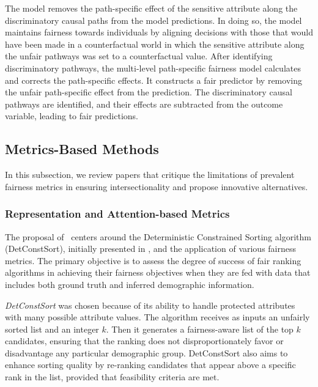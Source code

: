 The model removes the path-specific effect of the sensitive attribute along the discriminatory causal paths from the model predictions. In doing so, the model maintains fairness towards individuals by aligning decisions with those that would have been made in a counterfactual world in which the sensitive attribute along the unfair pathways was set to a counterfactual value.
After identifying discriminatory pathways, the multi-level path-specific fairness model calculates and corrects the path-specific effects. It constructs a fair predictor by removing the unfair path-specific effect from the prediction. The discriminatory causal pathways are identified, and their effects are subtracted from the outcome variable, leading to fair predictions.


\subsection{Metrics-Based Methods}
\label{subsec:intrank_meth_metr}

In this subsection, we review papers that critique the limitations of prevalent fairness metrics in ensuring intersectionality and propose innovative alternatives.


\subsubsection{Representation and Attention-based Metrics}
\label{subsec:intrank_meth_metr_17n}

The proposal of~\cite{ghosh2021fair} centers around the Deterministic Constrained Sorting algorithm (DetConstSort), initially presented in \cite{geyik2019fairness}, and the application of various fairness metrics. The primary objective is to assess the degree of success of fair ranking algorithms in achieving their fairness objectives when they are fed with data that includes both ground truth and inferred demographic information.

\emph{DetConstSort} was chosen because of its ability to handle protected attributes with many possible attribute values.
The algorithm receives as inputs an unfairly sorted list and an integer $k$. Then it generates a fairness-aware list of the top $k$ candidates, ensuring that 
the ranking does not disproportionately favor or disadvantage any particular demographic group.
DetConstSort also aims to enhance sorting quality by re-ranking candidates that appear above a specific rank in the list, provided that feasibility criteria are met.

